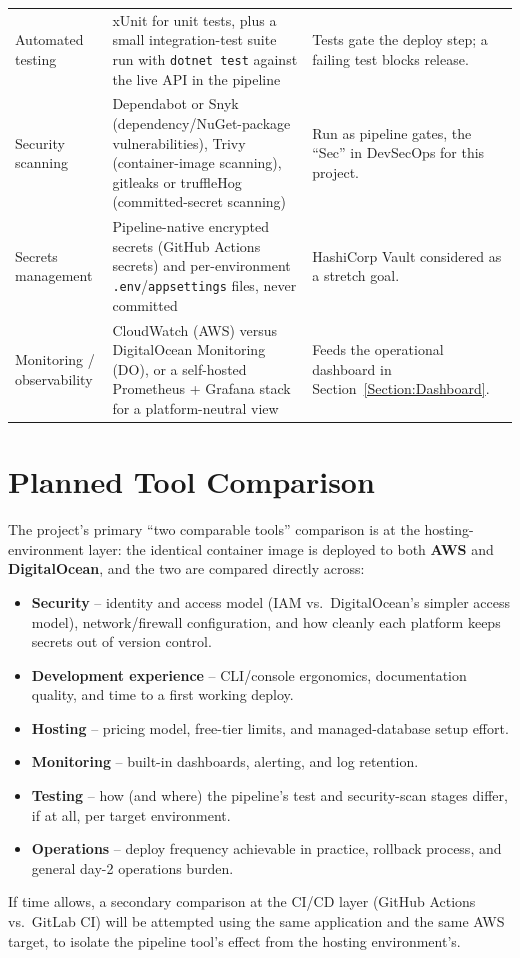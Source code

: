 \begin{tabularx}{\linewidth}{L{3.0cm}L{3.6cm}Y}
Automated testing & xUnit for unit tests, plus a small integration-test suite run with \texttt{dotnet test} against the live API in the pipeline & Tests gate the deploy step; a failing test blocks release.\\
Security scanning & Dependabot or Snyk (dependency/NuGet-package vulnerabilities), Trivy (container-image scanning), gitleaks or truffleHog (committed-secret scanning) & Run as pipeline gates, the ``Sec'' in DevSecOps for this project.\\
Secrets management & Pipeline-native encrypted secrets (GitHub Actions secrets) and per-environment \texttt{.env}/\texttt{appsettings} files, never committed & HashiCorp Vault considered as a stretch goal.\\
Monitoring / observability & CloudWatch (AWS) versus DigitalOcean Monitoring (DO), or a self-hosted Prometheus + Grafana stack for a platform-neutral view & Feeds the operational dashboard in Section~\ref{Section:Dashboard}.\\ \bottomrule
\end{tabularx}

\section{Planned Tool Comparison}
\label{Section:ToolComparison}
The project's primary ``two comparable tools'' comparison is at the hosting-environment
layer: the identical container image is deployed to both \textbf{AWS} and
\textbf{DigitalOcean}, and the two are compared directly across:
\begin{itemize}
\item \textbf{Security} -- identity and access model (IAM vs.\ DigitalOcean's simpler access model), network/firewall configuration, and how cleanly each platform keeps secrets out of version control.
\item \textbf{Development experience} -- CLI/console ergonomics, documentation quality, and time to a first working deploy.
\item \textbf{Hosting} -- pricing model, free-tier limits, and managed-database setup effort.
\item \textbf{Monitoring} -- built-in dashboards, alerting, and log retention.
\item \textbf{Testing} -- how (and where) the pipeline's test and security-scan stages differ, if at all, per target environment.
\item \textbf{Operations} -- deploy frequency achievable in practice, rollback process, and general day-2 operations burden.
\end{itemize}
If time allows, a secondary comparison at the CI/CD layer (GitHub Actions vs.\
GitLab CI) will be attempted using the same application and the same AWS
target, to isolate the pipeline tool's effect from the hosting environment's.

